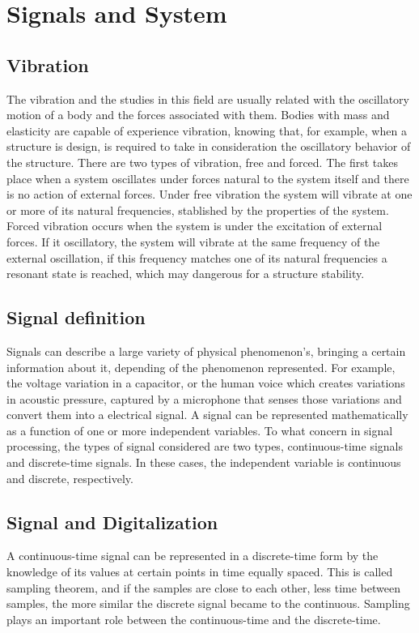 
\section{Signals and System}\label{sec:sigNsys}
\subsection{Vibration}
The vibration and the studies in this field are usually related with the oscillatory motion of a body and the forces associated with them. Bodies with mass and elasticity are capable of experience vibration, knowing that, for example, when a structure is design, is required to take in consideration the oscillatory behavior of the structure. There are two types of vibration, free and forced. The first takes place when a system oscillates under forces natural to the system itself and there is no action of external forces. Under free vibration the system will vibrate at one or more of its natural frequencies, stablished by the properties of the system. Forced vibration occurs when the system is under the excitation of external forces. If it oscillatory, the system will vibrate at the same frequency of the external oscillation, if this frequency matches one of its natural frequencies a resonant state is reached, which may dangerous for a structure stability.   

\subsection{Signal definition}
Signals can describe a large variety of physical phenomenon's, bringing a certain information about it, depending of the phenomenon represented. For example, the voltage variation in a capacitor, or the human voice which creates variations in acoustic pressure, captured by a microphone that senses those variations and convert them into a electrical signal. A signal can be represented mathematically as a function of one or more independent variables. 
To what concern in signal processing, the types of signal considered are two types, continuous-time signals and discrete-time signals. In these cases, the independent variable is continuous and discrete, respectively\cite{oppenheimSignalsSystems1997}.

\subsection{Signal and Digitalization}
A continuous-time signal can be represented in a discrete-time form by the knowledge of its values at certain points in time equally spaced. This is called sampling theorem, and if the samples are close to each other, less time between samples, the more similar the discrete signal became to the continuous. Sampling plays an important role between the continuous-time and the discrete-time.

